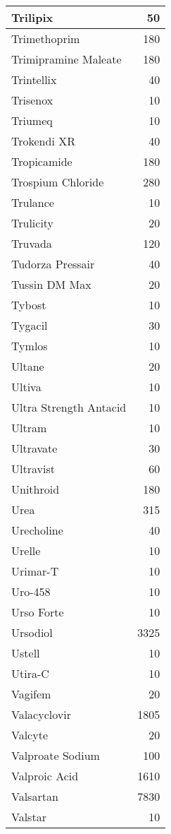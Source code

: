 \documentclass[
]{article}
\begin{document}
\begin{table}
\begin{tabular}[t]{l|r}
\hline
Trilipix & 50\\
\hline
Trimethoprim & 180\\
\hline
Trimipramine Maleate & 180\\
\hline
Trintellix & 40\\
\hline
Trisenox & 10\\
\hline
Triumeq & 10\\
\hline
Trokendi XR & 40\\
\hline
Tropicamide & 180\\
\hline
Trospium Chloride & 280\\
\hline
Trulance & 10\\
\hline
Trulicity & 20\\
\hline
Truvada & 120\\
\hline
Tudorza Pressair & 40\\
\hline
Tussin DM Max & 20\\
\hline
Tybost & 10\\
\hline
Tygacil & 30\\
\hline
Tymlos & 10\\
\hline
Ultane & 20\\
\hline
Ultiva & 10\\
\hline
Ultra Strength Antacid & 10\\
\hline
Ultram & 10\\
\hline
Ultravate & 30\\
\hline
Ultravist & 60\\
\hline
Unithroid & 180\\
\hline
Urea & 315\\
\hline
Urecholine & 40\\
\hline
Urelle & 10\\
\hline
Urimar-T & 10\\
\hline
Uro-458 & 10\\
\hline
Urso Forte & 10\\
\hline
Ursodiol & 3325\\
\hline
Ustell & 10\\
\hline
Utira-C & 10\\
\hline
Vagifem & 20\\
\hline
Valacyclovir & 1805\\
\hline
Valcyte & 20\\
\hline
Valproate Sodium & 100\\
\hline
Valproic Acid & 1610\\
\hline
Valsartan & 7830\\
\hline
Valstar & 10\\
\hline

\end{tabular}
\end{table}
\end{document}
